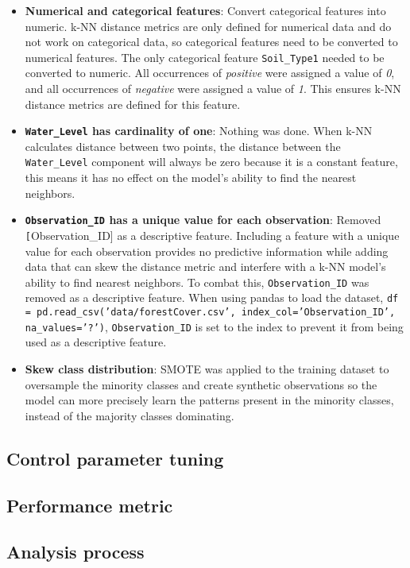 \documentclass[conference]{IEEEtran}
\begin{document}
\begin{itemize}
    \item \textbf{Numerical and categorical features}: Convert categorical features into numeric. k-NN distance metrics are only defined for numerical data and do not work on categorical data, so categorical features need to be converted to numerical features. The only categorical feature \texttt{Soil\_Type1} needed to be converted to numeric. All occurrences of \textit{positive} were assigned a value of \textit{0}, and all occurrences of \textit{negative} were assigned a value of \textit{1}. This ensures k-NN distance metrics are defined for this feature.
    \item \textbf{\texttt{Water\_Level} has cardinality of one}: Nothing was done. When k-NN calculates distance between two points, the distance between the \texttt{Water\_Level} component will always be zero because it is a constant feature, this means it has no effect on the model's ability to find the nearest neighbors.
    \item \textbf{\texttt{Observation\_ID} has a unique value for each observation}: Removed \texttt[Observation\_ID] as a descriptive feature. Including a feature with a unique value for each observation provides no predictive information while adding data that can skew the distance metric and interfere with a k-NN model's ability to find nearest neighbors. To combat this, \texttt{Observation\_ID} was removed as a descriptive feature. When using pandas to load the dataset, \texttt{df = pd.read\_csv('data/forestCover.csv', index\_col='Observation\_ID', na\_values='?')}, \texttt{Observation\_ID} is set to the index to prevent it from being used as a descriptive feature.
    \item \textbf{Skew class distribution}: SMOTE was applied to the training dataset to oversample the minority classes and create synthetic observations so the model can more precisely learn the patterns present in the minority classes, instead of the majority classes dominating. 
\end{itemize}

\subsection{\textbf{Control parameter tuning}}

\subsection{Performance metric}

\subsection{Analysis process}
\end{document}
